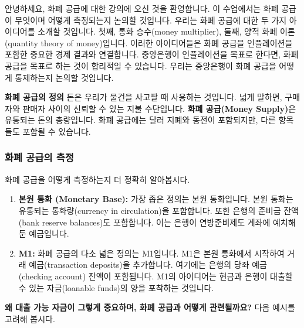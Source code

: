\documentclass[11pt,a4paper]{article}
\theoremstyle{definition}
\begin{document}
안녕하세요, 화폐 공급에 대한 강의에 오신 것을 환영합니다. 이 수업에서는 화폐 공급이 무엇이며 어떻게 측정되는지 논의할 것입니다. 우리는 화폐 공급에 대한 두 가지 아이디어를 소개할 것입니다. 첫째, 통화 승수(money multiplier), 둘째, 양적 화폐 이론(quantity theory of money)입니다. 이러한 아이디어들은 화폐 공급을 인플레이션을 포함한 중요한 경제 결과와 연결합니다. 중앙은행이 인플레이션을 목표로 한다면, 화폐 공급을 목표로 하는 것이 합리적일 수 있습니다. 우리는 중앙은행이 화폐 공급을 어떻게 통제하는지 논의할 것입니다.

\begin{conceptbox}
\textbf{화폐 공급의 정의}
돈은 우리가 물건을 사고팔 때 사용하는 것입니다. 넓게 말하면, 구매자와 판매자 사이의 신뢰할 수 있는 지불 수단입니다. \textbf{화폐 공급(Money Supply)}은 유통되는 돈의 총량입니다. 화폐 공급에는 달러 지폐와 동전이 포함되지만, 다른 항목들도 포함될 수 있습니다.
\end{conceptbox}

\subsubsection*{화폐 공급의 측정}
화폐 공급을 어떻게 측정하는지 더 정확히 알아봅시다.

\begin{enumerate}
    \item \textbf{본원 통화 (Monetary Base):} 가장 좁은 정의는 본원 통화입니다. 본원 통화는 유통되는 통화량(currency in circulation)을 포함합니다. 또한 은행의 준비금 잔액(bank reserve balances)도 포함합니다. 이는 은행이 연방준비제도 계좌에 예치해 둔 예금입니다.
    \item \textbf{M1:} 화폐 공급의 다소 넓은 정의는 M1입니다. M1은 본원 통화에서 시작하여 거래 예금(transaction deposits)을 추가합니다. 여기에는 은행의 당좌 예금(checking account) 잔액이 포함됩니다. M1의 아이디어는 현금과 은행이 대출할 수 있는 자금(loanable funds)의 양을 포착하는 것입니다.
\end{enumerate}

\textbf{왜 대출 가능 자금이 그렇게 중요하며, 화폐 공급과 어떻게 관련될까요?}
다음 예시를 고려해 봅시다.
\end{document}

